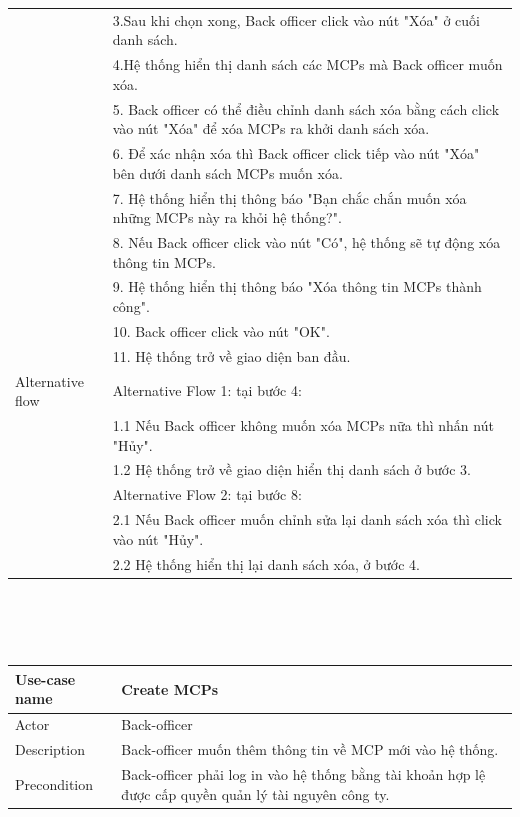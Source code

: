 \documentclass[a4paper]{article}
\begin{document}
\begin{enumerate}
\begin{enumerate}
\begin{tabular}{|p{3cm}|p{10cm}|}
         &3.Sau khi chọn xong, Back officer click vào nút "Xóa" ở cuối danh sách. \\
         &4.Hệ thống hiển thị danh sách các MCPs mà Back officer muốn xóa. \\
         &5. Back officer có thể điều chỉnh danh sách xóa bằng cách click vào nút "Xóa" để xóa MCPs ra khởi danh sách xóa.\\
         &6. Để xác nhận xóa thì Back officer click tiếp vào nút "Xóa" bên dưới danh sách MCPs muốn xóa.\\
         &7. Hệ thống hiển thị thông báo "Bạn chắc chắn muốn xóa những MCPs này ra khỏi hệ thống?". \\
         &8. Nếu Back officer click vào nút "Có", hệ thống sẽ tự động xóa thông tin MCPs. \\
         &9. Hệ thống hiển thị thông báo "Xóa thông tin MCPs thành công". \\
         &10. Back officer click vào nút "OK". \\
         &11. Hệ thống trở về giao diện ban đầu. \\
         \hline
         Alternative flow & 
         Alternative Flow 1: tại bước 4: \\
        &1.1 Nếu Back officer không muốn xóa MCPs nữa thì nhấn nút
        "Hủy". \\
        &1.2 Hệ thống trở về giao diện hiển thị danh sách ở bước 3.\\
        &Alternative Flow 2: tại bước 8:\\
        &2.1 Nếu Back officer muốn chỉnh sửa lại danh sách xóa thì click vào nút "Hủy". \\
        &2.2 Hệ thống hiển thị lại danh sách xóa, ở bước 4.\\
        \hline
    \end{tabular}
    \\ \\ \\
    \begin{tabular}{|p{3cm} | p{10cm} |}
    \hline
         Use-case name & \textbf{Create MCPs}  \\
         \hline
         Actor & Back-officer \\
         \hline
         Description & Back-officer muốn thêm thông tin về MCP mới vào hệ thống. \\
         \hline
         Precondition & Back-officer phải log in vào hệ thống bằng tài khoản hợp lệ được cấp quyền quản lý tài nguyên công ty. \\

\end{tabular}
\end{enumerate}
\end{enumerate}
\end{document}
